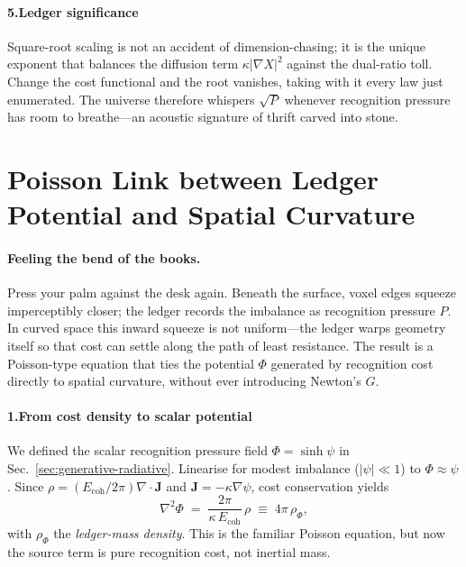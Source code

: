 \documentclass[11pt,oneside]{book}
\newcommand{\Eoh}{\ensuremath{E_{\text{coh}}}}       %
\begin{document}
\paragraph*{5.\;Ledger significance}

Square-root scaling is not an accident of dimension-chasing; it is the
unique exponent that balances the diffusion term $\kappa|\nabla X|^{2}$
against the dual-ratio toll.  
Change the cost functional and the root vanishes, taking with it every
law just enumerated.  
The universe therefore whispers $\sqrt{P}$ whenever recognition pressure
has room to breathe—an acoustic signature of thrift carved into stone.

\bigskip

\section{Poisson Link between Ledger Potential and Spatial Curvature}
\label{sec:poisson-curvature}

\paragraph*{Feeling the bend of the books.}
Press your palm against the desk again.  
Beneath the surface, voxel edges squeeze imperceptibly closer; the ledger
records the imbalance as recognition pressure \(P\).  
In curved space this inward squeeze is not uniform—the ledger warps
geometry itself so that cost can settle along the path of least
resistance.  
The result is a Poisson-type equation that ties the potential
\(\Phi\) generated by recognition cost directly to spatial curvature,
without ever introducing Newton’s \(G\).

\paragraph*{1.\;From cost density to scalar potential}

We defined the scalar recognition pressure field
\(\Phi=\sinh\psi\) in Sec.~\ref{sec:generative-radiative}.  
Linearise for modest imbalance (\(|\psi|\ll1\)) to
\(\Phi\approx\psi\).  
Since \(\rho=(\Eoh/2\pi)\nabla\!\cdot\!\mathbf J\) and
\(\mathbf J=-\kappa\nabla\psi\), cost conservation yields
\[
  \nabla^{2}\Phi
  \;=\;
  \frac{2\pi}{\kappa\,\Eoh}\,\rho
  \;\equiv\;
  4\pi\,\rho_{\Phi},
\]
with \(\rho_{\Phi}\) the \emph{ledger-mass density}.  
This is the familiar Poisson equation, but now the source term is pure
recognition cost, not inertial mass.
\end{document}
